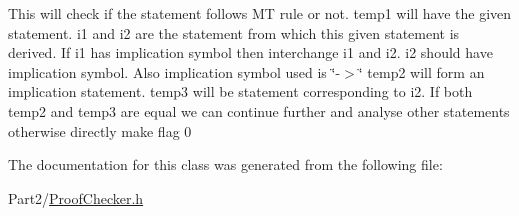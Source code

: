This will check if the statement follows MT rule or not. temp1 will have the given statement. i1 and i2 are the statement from which this given statement is derived. If i1 has implication symbol then interchange i1 and i2. i2 should have implication symbol. Also implication symbol used is \char`\"{}-\/$>$\char`\"{} temp2 will form an implication statement. temp3 will be statement corresponding to i2. If both temp2 and temp3 are equal we can continue further and analyse other statements otherwise directly make flag 0 

The documentation for this class was generated from the following file\+:\begin{DoxyCompactItemize}
\item 
Part2/\mbox{\hyperlink{_proof_checker_8h}{Proof\+Checker.\+h}}\end{DoxyCompactItemize}
